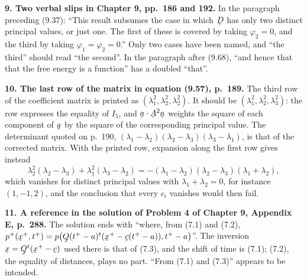 \documentclass[12pt,a4paper]{article}
\DeclareRobustCommand{\vek}[1]{\underaccent{\tilde}{#1}}
\newcommand{\bx}{\vek{x}}
\newcommand{\bA}{\vek{A}}
\newcommand{\ba}{\vek{a}}
\newcommand{\bQ}{\vek{Q}}
\newcommand{\bc}{\vek{c}}
\newenvironment{query}[1]%
  {\par\medskip\noindent\textbf{#1}\quad}{\par\medskip}
\begin{document}
\begin{query}{9. Two verbal slips in Chapter 9, pp.~186 and 192.}
In the paragraph preceding (9.37): ``This result subsumes the case in
which $\vek{D}$ has only two distinct principal values, or just one. The
first of these is covered by taking $\varphi_{2}=0$, and the third by
taking $\varphi_{1}=\varphi_{2}=0$.'' Only two cases have been named, and
``the third'' should read ``the second''. In the paragraph after (9.68),
``and hence that that the free energy is a function'' has a doubled
``that''.
\end{query}

\begin{query}{10. The last row of the matrix in equation (9.57), p.~189.}
The third row of the coefficient matrix is printed as
$(\lambda_{1}^{2},\lambda_{2}^{2},\lambda_{2}^{2})$. It should be
$(\lambda_{1}^{2},\lambda_{2}^{2},\lambda_{3}^{2})$: the row expresses
the equality of $I_{5}$, and $\ba\cdot\bA^{2}\ba$ weights the square of
each component of $\ba$ by the square of the corresponding principal
value. The determinant quoted on p.~190,
$(\lambda_{1}-\lambda_{2})(\lambda_{2}-\lambda_{3})(\lambda_{3}-\lambda_{1})$,
is that of the corrected matrix. With the printed row, expansion along
the first row gives instead
\[
   \lambda_{2}^{2}(\lambda_{2}-\lambda_{3})
   +\lambda_{1}^{2}(\lambda_{3}-\lambda_{2})
   =-(\lambda_{1}-\lambda_{2})(\lambda_{2}-\lambda_{3})
    (\lambda_{1}+\lambda_{2}),
\]
which vanishes for distinct principal values with
$\lambda_{1}+\lambda_{2}=0$, for instance $(1,-1,2)$, and the conclusion
that every $c_{i}$ vanishes would then fail.
\end{query}

\begin{query}{11. A reference in the solution of Problem 4 of Chapter 9,
Appendix E, p.~288.}
The solution ends with ``where, from (7.1) and (7.2),
$p^{+}(\bx^{+},t^{+})=p\big(\bQ(t^{+}-a)^{t}(\bx^{+}-\bc(t^{+}-a)),
t^{+}-a\big)$''. The inversion $\bx=\bQ^{t}(\bx^{+}-\bc)$ used there is
that of (7.3), and the shift of time is (7.1); (7.2), the equality of
distances, plays no part. ``From (7.1) and (7.3)'' appears to be
intended.
\end{query}
\end{document}
